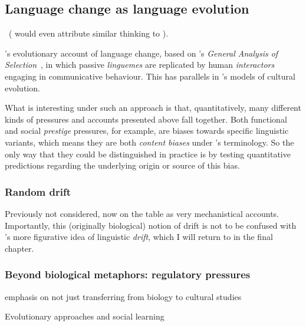 

\subsection{Language change as language evolution}\label{sec:evolutionaryapproaches}

~(\citealt{Weinreich1968} would even attribute similar thinking to \citealt{Paul1920}).

\citet{Croft2000}'s evolutionary account of language change, based on \citeauthor{Hull1988}'s \emph{General Analysis of Selection}~\citeyearpar{Hull1988}, in which passive \emph{linguemes} are replicated by human \emph{interactors} engaging in communicative behaviour.
This has parallels in \citet{Boyd1985}'s models of cultural evolution.

What is interesting under such an approach is that, quantitatively, many different kinds of pressures and accounts presented above fall together. Both functional and social \emph{prestige} pressures, for example, are biases towards specific linguistic variants, which means they are both \emph{content biases} under \citeauthor{Boyd1985}'s terminology. So the only way that they could be distinguished in practice is by testing quantitative predictions regarding the underlying origin or source of this bias.


\subsubsection{Random drift}
Previously not considered, now on the table as very mechanistical accounts. Importantly, this (originally biological) notion of drift is not to be confused with \citet{Sapir1921}'s more figurative idea of linguistic \emph{drift}, which I will return to in the final chapter.

\subsubsection{Beyond biological metaphors: regulatory pressures}

emphasis on not just transferring from biology to cultural studies

Evolutionary approaches and social learning

\citep{Altmann2013,Acerbi2014}

